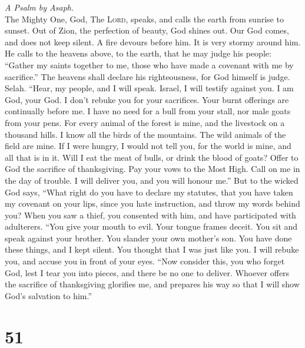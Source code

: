 \emph{A Psalm by Asaph.}\\
 The Mighty One, God, The \textsc{Lord}, speaks, and calls
the earth from sunrise to sunset.  Out of Zion, the
perfection of beauty, God shines out.  Our God comes, and
does not keep silent. A fire devours before him. It is very stormy
around him.  He calls to the heavens above, to the earth,
that he may judge his people:  ``Gather my saints together
to me, those who have made a covenant with me by sacrifice.''
 The heavens shall declare his righteousness, for God
himself is judge. Selah.  ``Hear, my people, and I will
speak. Israel, I will testify against you. I am God, your God.
 I don't rebuke you for your sacrifices. Your burnt
offerings are continually before me.  I have no need for a
bull from your stall, nor male goats from your pens.  For
every animal of the forest is mine, and the livestock on a thousand
hills.  I know all the birds of the mountains. The wild
animals of the field are mine.  If I were hungry, I would
not tell you, for the world is mine, and all that is in it.
 Will I eat the meat of bulls, or drink the blood of
goats?  Offer to God the sacrifice of thanksgiving. Pay
your vows to the Most High.  Call on me in the day of
trouble. I will deliver you, and you will honour me.'' 
But to the wicked God says, ``What right do you have to declare my
statutes, that you have taken my covenant on your lips, 
since you hate instruction, and throw my words behind you?
 When you saw a thief, you consented with him, and have
participated with adulterers.  ``You give your mouth to
evil. Your tongue frames deceit.  You sit and speak
against your brother. You slander your own mother's son. 
You have done these things, and I kept silent. You thought that I was
just like you. I will rebuke you, and accuse you in front of your eyes.
 ``Now consider this, you who forget God, lest I tear you
into pieces, and there be no one to deliver.  Whoever
offers the sacrifice of thanksgiving glorifies me, and prepares his way
so that I will show God's salvation to him.''

\hypertarget{section-50}{%
\section{51}\label{section-50}}

